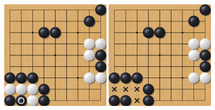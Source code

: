 \documentclass[compress, color = usenames, dvipsnames]{beamer}
\begin{document}
{\begin{center}
       { \includegraphics[width=0.4\textwidth]{figs/gorule_capture5.png} }
       { \includegraphics[width=0.4\textwidth]{figs/gorule_capture6.png} }
  \end{center}

}
\end{document}
